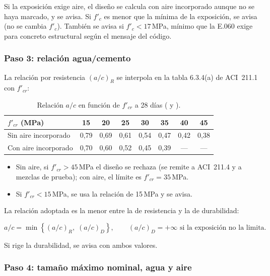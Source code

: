 Si la exposición exige aire, el diseño se calcula con aire incorporado aunque no se haya marcado, y se avisa. Si
$f'_c$ es menor que la mínima de la exposición, se avisa (no se cambia $f'_c$). También se avisa si $f'_c < 17$\,MPa,
mínimo que la E.060 exige para concreto estructural según el mensaje del código.

\subsubsection{Paso 3: relación agua/cemento}

La relación por resistencia $(a/c)_R$ se interpola en la tabla 6.3.4(a) de ACI~211.1 con $f'_{cr}$:

\begin{table}[H]
	\centering
	\caption{Relación $a/c$ en función de $f'_{cr}$ a 28 días ( y ).}
	\label{tab:con-ac}
	\begin{tabular}{L{3.8cm}ccccccc}
		\hline
		\textbf{$f'_{cr}$ (MPa)} & 15 & 20 & 25 & 30 & 35 & 40 & 45 \\ \hline
		Sin aire incorporado & 0,79 & 0,69 & 0,61 & 0,54 & 0,47 & 0,42 & 0,38 \\
		Con aire incorporado & 0,70 & 0,60 & 0,52 & 0,45 & 0,39 & --- & --- \\
		\hline
	\end{tabular}
\end{table}

\begin{itemize}
	\item Sin aire, si $f'_{cr} > 45$\,MPa el diseño se rechaza (se remite a ACI~211.4 y a mezclas de prueba); con aire,
	      el límite es $f'_{cr} = 35$\,MPa.
	\item Si $f'_{cr} < 15$\,MPa, se usa la relación de 15\,MPa y se avisa.
\end{itemize}

La relación adoptada es la menor entre la de resistencia y la de durabilidad:

\begin{equation}
	a/c = \min\left\{ (a/c)_R,\; (a/c)_D \right\}, \qquad (a/c)_D = +\infty \text{ si la exposición no la limita}.
\end{equation}

Si rige la durabilidad, se avisa con ambos valores.

\subsubsection{Paso 4: tamaño máximo nominal, agua y aire}

